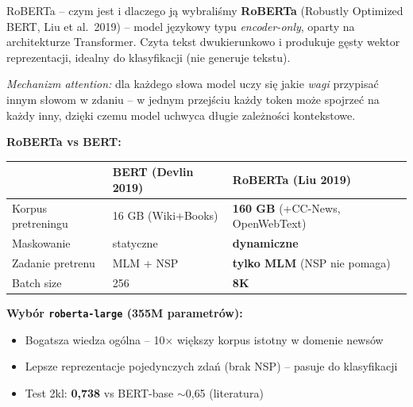 \documentclass[10pt]{beamer}
\begin{document}
\begin{frame}{RoBERTa -- czym jest i dlaczego ją wybraliśmy}
  \small
  \textbf{RoBERTa} (Robustly Optimized BERT, Liu et al.\ 2019) -- model
  językowy typu \emph{encoder-only}, oparty na architekturze Transformer.
  Czyta tekst dwukierunkowo i produkuje gęsty wektor reprezentacji,
  idealny do klasyfikacji (nie generuje tekstu).

  \emph{Mechanizm attention:} dla każdego słowa model uczy się jakie
  \emph{wagi} przypisać innym słowom w zdaniu -- w jednym przejściu
  każdy token może spojrzeć na każdy inny, dzięki czemu model uchwyca
  długie zależności kontekstowe.

  \vspace{0.3em}
  \textbf{RoBERTa vs BERT:}
  \begin{center}
  \begin{tabular}{lll}
    \toprule
     & \textbf{BERT (Devlin 2019)} & \textbf{RoBERTa (Liu 2019)} \\
    \midrule
    Korpus pretreningu & 16 GB (Wiki+Books) & \textbf{160 GB} (+CC-News, OpenWebText) \\
    Maskowanie         & statyczne          & \textbf{dynamiczne} \\
    Zadanie pretrenu   & MLM + NSP          & \textbf{tylko MLM} (NSP nie pomaga) \\
    Batch size         & 256                & \textbf{8K} \\
    \bottomrule
  \end{tabular}
  \end{center}

  \vspace{0.3em}
  \textbf{Wybór \texttt{roberta-large} (355M parametrów):}
  \begin{itemize}
    \item Bogatsza wiedza ogólna -- 10$\times$ większy korpus istotny w domenie newsów
    \item Lepsze reprezentacje pojedynczych zdań (brak NSP) -- pasuje do klasyfikacji
    \item Test 2kl: \textbf{0{,}738} vs BERT-base $\sim$0{,}65 (literatura)
  \end{itemize}
\end{frame}
\end{document}
